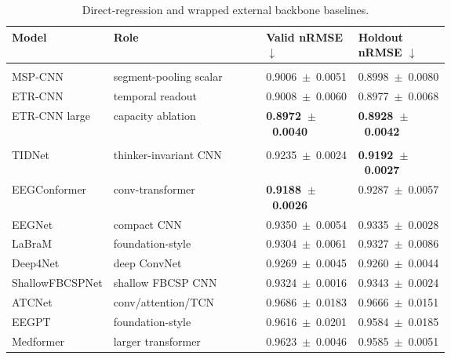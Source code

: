 \documentclass[12pt]{article}
\begin{document}
\begin{table}[!t]
\centering
\caption{Direct-regression and wrapped external backbone baselines.}
\label{tab:r11_regression_baselines}
\footnotesize
\setlength{\tabcolsep}{2pt}
\renewcommand{\arraystretch}{1.15}
\begin{tabularx}{\linewidth}{@{} >{\RaggedRight\arraybackslash}p{0.22\linewidth} Y >{\centering\arraybackslash}p{0.215\linewidth} >{\centering\arraybackslash}p{0.215\linewidth} @{}}
\toprule
\textbf{Model} & \textbf{Role} & \textbf{Valid nRMSE} $\downarrow$ & \textbf{Holdout nRMSE} $\downarrow$ \\
\midrule
{} \\
\addlinespace[0.15em]
MSP-CNN & segment-pooling scalar & \mbox{0.9006 $\pm$ 0.0051} & \mbox{0.8998 $\pm$ 0.0080} \\
ETR-CNN & temporal readout & \mbox{0.9008 $\pm$ 0.0060} & \mbox{0.8977 $\pm$ 0.0068} \\
ETR-CNN large & capacity ablation & \textbf{\mbox{0.8972 $\pm$ 0.0040}} & \textbf{\mbox{0.8928 $\pm$ 0.0042}} \\
\midrule
{} \\
\addlinespace[0.15em]
TIDNet & thinker-invariant CNN & \mbox{0.9235 $\pm$ 0.0024} & \textbf{\mbox{0.9192 $\pm$ 0.0027}} \\
EEGConformer & conv-transformer & \textbf{\mbox{0.9188 $\pm$ 0.0026}} & \mbox{0.9287 $\pm$ 0.0057} \\
EEGNet & compact CNN & \mbox{0.9350 $\pm$ 0.0054} & \mbox{0.9335 $\pm$ 0.0028} \\
LaBraM & foundation-style & \mbox{0.9304 $\pm$ 0.0061} & \mbox{0.9327 $\pm$ 0.0086} \\
Deep4Net & deep ConvNet & \mbox{0.9269 $\pm$ 0.0045} & \mbox{0.9260 $\pm$ 0.0044} \\
ShallowFBCSPNet & shallow FBCSP CNN & \mbox{0.9324 $\pm$ 0.0016} & \mbox{0.9343 $\pm$ 0.0024} \\
ATCNet & conv/attention/TCN & \mbox{0.9686 $\pm$ 0.0183} & \mbox{0.9666 $\pm$ 0.0151} \\
EEGPT & foundation-style & \mbox{0.9616 $\pm$ 0.0201} & \mbox{0.9584 $\pm$ 0.0185} \\
Medformer & larger transformer & \mbox{0.9623 $\pm$ 0.0046} & \mbox{0.9585 $\pm$ 0.0051} \\
\bottomrule
\end{tabularx}
\end{table}
\end{document}
